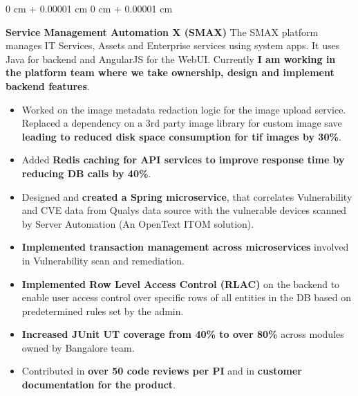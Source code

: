 \documentclass[10pt, letterpaper]{article}
\newenvironment{highlights}{
    \begin{itemize}[
        topsep=0.10 cm,
        parsep=0.10 cm,
        partopsep=0pt,
        itemsep=0pt,
        leftmargin=0 cm + 10pt
    ]
}{
    \end{itemize}
} %
\newenvironment{onecolentry}{
    \begin{adjustwidth}{
        0 cm + 0.00001 cm
    }{
        0 cm + 0.00001 cm
    }
}{
    \end{adjustwidth}
} %
\begin{document}
        \vspace{0.20 cm}
        \begin{onecolentry}
            \textbf{Service Management Automation X (SMAX)}
            \newline The SMAX platform manages IT Services, Assets and Enterprise services using system apps. It uses Java for backend and AngularJS for the WebUI. Currently \textbf{I am working in the platform team where we take ownership, design and implement backend features}.
            \begin{highlights}
                \item Worked on the image metadata redaction logic for the image upload service. Replaced a dependency on a 3rd party image library for custom image save \textbf{leading to reduced disk space consumption for tif images by 30\%}.
                \item Added \textbf{Redis caching for API services to improve response time by reducing DB calls by 40\%}.
                \item Designed and \textbf{created a Spring microservice}, that correlates Vulnerability and CVE data from Qualys data source with the vulnerable devices scanned by Server Automation (An OpenText ITOM solution).
                \item \textbf{Implemented transaction management across microservices} involved in Vulnerability scan and remediation.
                \item \textbf{Implemented Row Level Access Control (RLAC)} on the backend to enable user access control over specific rows of all entities in the DB based on predetermined rules set by the admin.
                \item \textbf{Increased JUnit UT coverage from 40\% to over 80\%} across modules owned by Bangalore team.
                \item Contributed in \textbf{over 50 code reviews per PI} and in \textbf{customer documentation for the product}.
            \end{highlights}
        \end{onecolentry}
        
\end{document}
